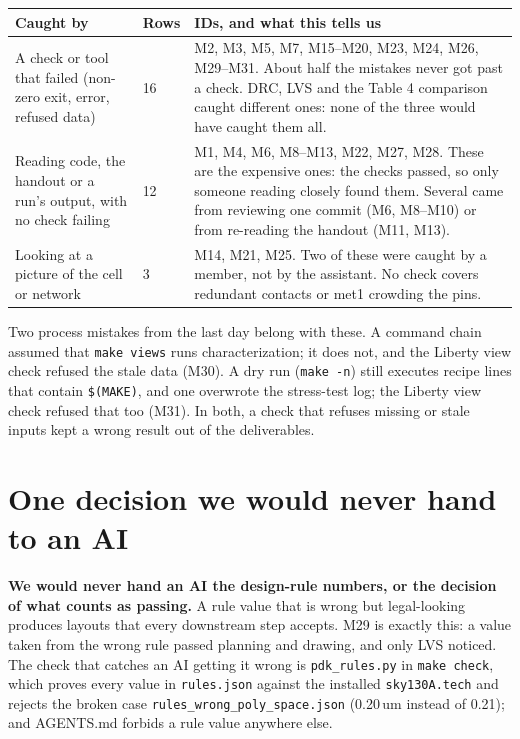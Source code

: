 \documentclass[10pt,a4paper]{article}
\newcommand{\code}[1]{\texttt{#1}}
\begin{document}
{\small
\begin{longtable}{@{}L{42mm}L{10mm}L{113mm}@{}}
\toprule
\textbf{Caught by} & \textbf{Rows} & \textbf{IDs, and what this tells us}\\
\midrule\endhead
A check or tool that failed (non-zero exit, error, refused data) & 16 & M2, M3, M5, M7, M15--M20, M23, M24, M26, M29--M31. About half the mistakes never got past a check. DRC, LVS and the Table 4 comparison caught different ones: none of the three would have caught them all.\\
Reading code, the handout or a run's output, with no check failing & 12 & M1, M4, M6, M8--M13, M22, M27, M28. These are the expensive ones: the checks passed, so only someone reading closely found them. Several came from reviewing one commit (M6, M8--M10) or from re-reading the handout (M11, M13).\\
Looking at a picture of the cell or network & 3 & M14, M21, M25. Two of these were caught by a member, not by the assistant. No check covers redundant contacts or met1 crowding the pins.\\
\bottomrule
\end{longtable}}

Two process mistakes from the last day belong with these. A command chain assumed that \code{make views} runs characterization; it does not, and the Liberty view check refused the stale data (M30). A dry run (\code{make -n}) still executes recipe lines that contain \code{\$(MAKE)}, and one overwrote the stress-test log; the Liberty view check refused that too (M31). In both, a check that refuses missing or stale inputs kept a wrong result out of the deliverables.

\section{One decision we would never hand to an AI}
\textbf{We would never hand an AI the design-rule numbers, or the decision of what counts as passing.} A rule value that is wrong but legal-looking produces layouts that every downstream step accepts. M29 is exactly this: a value taken from the wrong rule passed planning and drawing, and only LVS noticed. The check that catches an AI getting it wrong is \code{pdk\_rules.py} in \code{make check}, which proves every value in \code{rules.json} against the installed \code{sky130A.tech} and rejects the broken case \code{rules\_wrong\_poly\_space.json} (0.20\,um instead of 0.21); and AGENTS.md forbids a rule value anywhere else.
\end{document}

